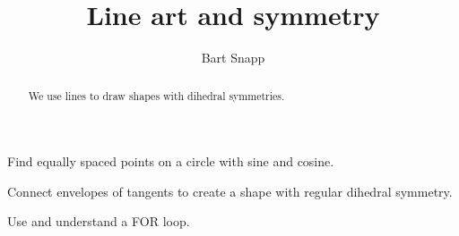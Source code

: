 \documentclass[noauthor,nooutcomes,12pt,hints,handout]{ximera}
\author{Bart Snapp}
\title{Line art and symmetry}
\begin{document}
\begin{abstract}
  We use lines to draw shapes with dihedral symmetries.
\end{abstract}
\maketitle

\begin{listOutcomes}
\item Find equally spaced points on a circle with sine and cosine.
\item Connect envelopes of tangents to create a shape with regular
  dihedral symmetry.
\item Use and understand a FOR loop.
\end{listOutcomes}

\mynewpage
\end{document}

